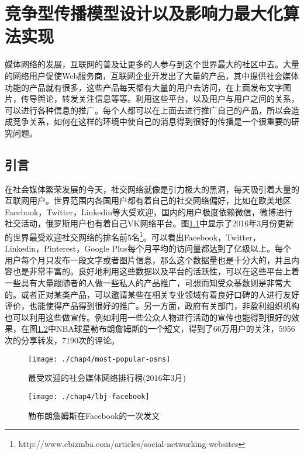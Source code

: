 

\chapter{竞争型传播模型设计以及影响力最大化算法实现}
\label{cha:4thChap04}
媒体网络的发展，互联网的普及让更多的人参与到这个世界最大的社区中去。大量的网络用户促使Web服务商，互联网企业开发出了大量的产品，其中提供社会媒体功能的产品就有很多，这些产品每天都有大量的用户去访问，在上面发布文字图片，传导舆论，转发关注信息等等。利用这些平台，以及用户与用户之间的关系，可以进行各种信息的推广。每个人都可以在上面去进行推广自己的产品，所以会造成竞争关系，如何在这样的环境中使自己的消息得到很好的传播是一个很重要的研究问题。

\section{引言}

在社会媒体繁荣发展的今天，社交网络就像是引力极大的黑洞，每天吸引着大量的互联网用户。世界范围内各国用户都有着自己的社交网络偏好，比如在欧美地区Facebook，Twitter，Linkedin等大受欢迎，国内的用户极度依赖微信，微博进行社交活动，俄罗斯用户也有着自己VK网络平台。图\ref{fig:chap4-most-pop-osns}中显示了2016年3月份更新的世界最受欢迎社交网络的排名前5名\footnote{http://www.ebizmba.com/articles/social-networking-websites}。可以看出Facebook，Twitter，Linkedin，Pinterest，Google Plus每个月平均的访问量都达到了亿级以上。每个用户每个月只发布一段文字或者图片信息，那么这个数据量也是十分大的，并且内容也是非常丰富的。良好地利用这些数据以及平台的活跃性，可以在这些平台上着一些具有大量跟随者的人做一些私人的产品推广，可想而知受众基数则是非常大的。或者正对某类产品，可以邀请某些在相关专业领域有着良好口碑的人进行友好评价，也能使得产品得到很好的推广。另一方面，政府有关部门，非盈利组织机构也可以利用这些做宣传。例如利用一些公众人物进行活动的宣传也能得到很好的效果，在图\ref{fig:chap4-lbj-facebook}中NBA球星勒布朗詹姆斯的一个短文，得到了66万用户的关注，5956次的分享转发，7190次的评论。

\begin{figure}[H]
	\centering
	\texttt{[image: ./chap4/most-popular-osns]}
	\caption{最受欢迎的社会媒体网络排行榜(2016年3月)}
	\label{fig:chap4-most-pop-osns}
\end{figure}


\begin{figure}[H]
	\centering
	\texttt{[image: ./chap4/lbj-facebook]}
	\caption{勒布朗詹姆斯在Facebook的一次发文}
	\label{fig:chap4-lbj-facebook}
\end{figure}

